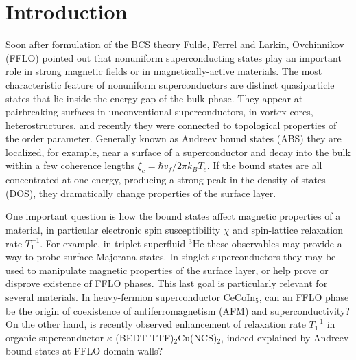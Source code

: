\documentclass[prb,aps,showpacs,amsmath,twocolumn,10pt]{revtex4-1}
\newcommand{\cecoin}{CeCoIn$_5$}
\newcommand{\kbtf}{$\kappa$-(BEDT-TTF)$_2$Cu(NCS)$_2$}
\begin{document}
\maketitle


\section{Introduction}
\label{sec:intro}
%

Soon after formulation of the BCS theory\cite{BCS}
Fulde, Ferrel\cite{PhysRev.135.A550} and Larkin, Ovchinnikov\cite{larkin1965inhomogeneous} (FFLO)
pointed out that nonuniform superconducting states play an important role 
in strong magnetic fields or in magnetically-active materials. 
The most characteristic feature of nonuniform superconductors are distinct quasiparticle states 
that lie inside the energy gap of the bulk phase. 
They appear at pairbreaking surfaces in unconventional superconductors,\cite{CHu1994} 
in vortex cores,\cite{CAROLI1964307} 
heterostructures,\cite{MEschrig2015}
and recently they were connected to topological properties of the order parameter.\cite{Tanaka2012,Mizushima2016}
Generally known as Andreev bound states (ABS) they are localized, for example, near 
a surface of a superconductor and decay into the bulk 
within a few coherence lengths $\xi_{c} = \hbar v_f/2\pi k_B T_c$.
If the bound states are all concentrated at one energy, 
producing a strong peak in the density of states (DOS), they dramatically change properties 
of the surface layer. 

One important question is how the bound states affect magnetic properties of a material, in particular 
electronic spin susceptibility $\chi$ and spin-lattice relaxation rate $T_1^{-1}$. 
For example, in triplet superfluid $^3$He these observables may provide a way to probe 
surface Majorana states.\cite{Nagato:2009chi,Chung:2009t1}
In singlet superconductors they may be used to manipulate magnetic properties of 
the surface layer, or help prove or disprove existence of FFLO phases. 
This last goal is particularly relevant for several materials. 
In heavy-fermion superconductor \cecoin, can an FFLO phase be the origin of 
coexistence\cite{cecoin5_Kenzelmann,cecoin5_Kenzelmann2,Gerber2014} of antiferromagnetism (AFM) and superconductivity?
On the other hand, is recently observed\cite{Mayaffre2014} enhancement of relaxation rate $T_1^{-1}$ 
in organic superconductor \kbtf, indeed explained by Andreev bound states at FFLO domain walls?  
\end{document}
